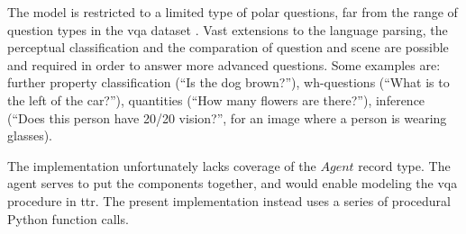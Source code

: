 The model is restricted to a limited type of polar questions, far from the range of question types in the \gls{vqa} dataset \citep{AgrawalVQAVisualQuestion2015}.
Vast extensions to the language parsing, the perceptual classification and the comparation of question and scene are possible and required in order to answer more advanced questions.
Some examples are:
further property classification (``Is the dog brown?''),
wh-questions (``What is to the left of the car?''),
quantities (``How many flowers are there?''),
inference (``Does this person have 20/20 vision?'', for an image where a person is wearing glasses).


The implementation unfortunately lacks coverage of the $Agent$ record type.
The agent serves to put the components together, and would enable modeling the \gls{vqa} procedure in \gls{ttr}.
The present implementation instead uses a series of procedural Python function calls.